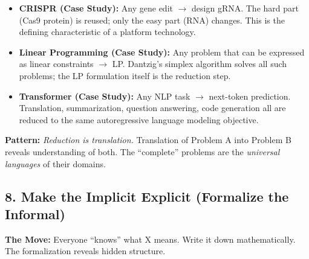 \begin{itemize}
\item \textbf{CRISPR (Case Study):} Any gene edit $\to$ design gRNA. The hard part (Cas9 protein) is reused; only the easy part (RNA) changes. This is the defining characteristic of a platform technology.

\item \textbf{Linear Programming (Case Study):} Any problem that can be expressed as linear constraints $\to$ LP. Dantzig's simplex algorithm solves all such problems; the LP formulation itself is the reduction step.

\item \textbf{Transformer (Case Study):} Any NLP task $\to$ next-token prediction. Translation, summarization, question answering, code generation all are reduced to the same autoregressive language modeling objective.
\end{itemize}

\textbf{Pattern:} \emph{Reduction is translation.} Translation of Problem A into Problem B reveals understanding of both. The ``complete'' problems are the \emph{universal languages} of their domains.
\subsection{8. Make the Implicit Explicit (Formalize the Informal)}
\label{sec:anatomy:formalize}

\textbf{The Move:} Everyone ``knows'' what X means. Write it down mathematically. The formalization reveals hidden structure.

